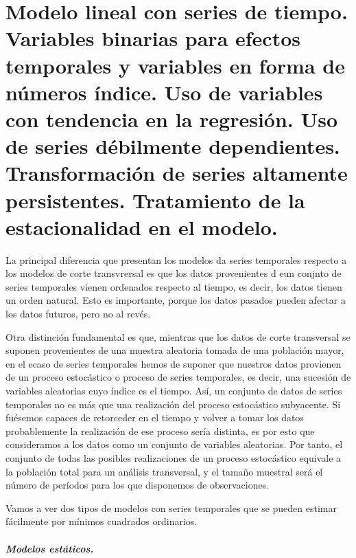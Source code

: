 \chapter[Modelo lineal con series de tiempo.]{Modelo lineal con series de tiempo. \\
\normalsize  Variables binarias para efectos temporales y variables en forma de n\'umeros \'indice. Uso de variables con tendencia en la regresi\'on. Uso de series d\'ebilmente dependientes. Transformaci\'on de series altamente persistentes. Tratamiento de la estacionalidad en el modelo.}



La principal diferencia que presentan los modelos da series temporales respecto a los modelos de corte transvrersal es que los datos provenientes d eun conjnto de series temporales vienen ordenados respecto al tiempo, es decir, los datos tienen un orden natural. Esto es importante, porque los datos pasados pueden afectar a los datos futuros, pero no al rev\'es.

Otra distinci\'on fundamental es que, mientras que los datos de corte transversal se suponen provenientes de una muestra aleatoria tomada de una poblaci\'on mayor, en el ecaso de series temporales hemos de suponer que nuestros datos provienen de un proceso estoc\'astico o proceso de series temporales, es decir, una sucesi\'on de variables aleatorias cuyo \'indice es el tiempo. As\'i, un conjunto de datos de series temporales no es m\'as que una realizaci\'on del proceso estoc\'astico subyacente. Si fu\'esemos capaces de retorceder en el tiempo y volver a tomar los datos probablemente la realizaci\'on de ese proceso ser\'ia distinta, es por esto que consideramos a los datos como un conjunto de variables aleatorias. Por tanto, el conjunto de todas las posibles realizaciones de un proceso estoc\'astico equivale a la poblaci\'on total para un an\'alisis transversal, y el tama\~no muestral ser\'a el n\'umero de per\'iodos para los que disponemos de observaciones.


Vamos a ver dos tipos de modelos con series temporales que se pueden estimar f\'acilmente por m\'inimos cuadrados ordinarios.

\paragraph{Modelos est\'aticos.}

